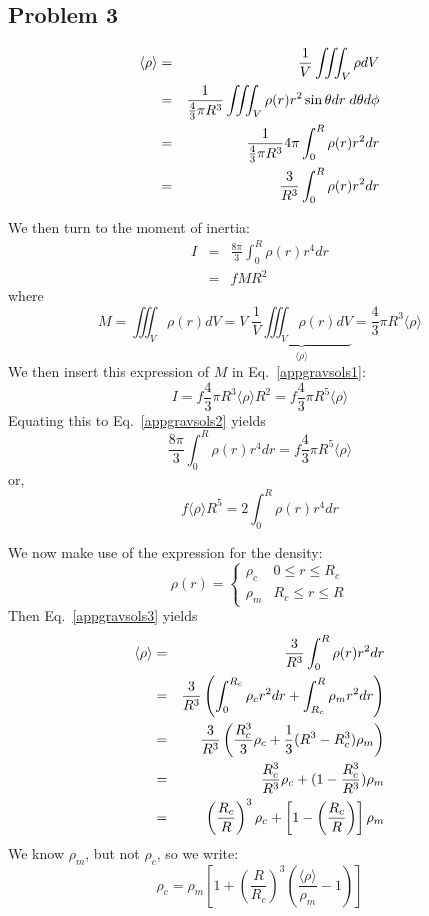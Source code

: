 \newpage
\subsection{Problem 3}


\begin{eqnarray}
\langle \rho \rangle 
&=& \frac{1}{V} \iiint_V \rho dV \nonumber\\
&=& \frac{1}{\frac{4}{3}\pi R^3} \iiint_V \rho(r) r^2 \sin\theta dr \; d\theta d\phi \nonumber\\
&=& \frac{1}{\frac{4}{3}\pi R^3}  4\pi \int_0^R \rho(r) r^2  dr \nonumber\\
&=& \frac{3}{R^3}   \int_0^R \rho(r) r^2  dr  \label{appgravsols3}
\end{eqnarray}

We then turn to the moment of inertia:
\begin{eqnarray}
I 
&=& \frac{8\pi}{3} \int_0^R \rho(r) r^4 dr \label{appgravsols2}\\
&=& f M R^2 \label{appgravsols1}
\end{eqnarray}
where 
\[
M 
= \iiint_V \rho(r) dV 
= V \; \underbrace{\frac{1}{V} \iiint_V \rho(r) dV }_{\langle\rho\rangle}
= \frac{4}{3}\pi R^3 \langle\rho\rangle
\]
We then insert this expression of $M$ in Eq.~\eqref{appgravsols1}:
\[
I
= f \frac{4}{3}\pi R^3 \langle\rho\rangle R^2
= f \frac{4}{3}\pi R^5 \langle\rho\rangle 
\]
Equating this to Eq.~\ref{appgravsols2} yields
\[
\frac{8\pi}{3} \int_0^R \rho(r) r^4 dr = f \frac{4}{3}\pi R^5 \langle\rho\rangle
\]
or, 
\begin{equation}
f \langle \rho \rangle R^5 = 2 \int_0^R \rho(r) r^4 dr  \label{appgravsols4}
\end{equation}


We now make use of the expression for the density:
\[
\rho(r) =
\left\{
\begin{array}{ll}
\rho_c & 0\leq r \leq R_c \\
\rho_m & R_c\leq r \leq R 
\end{array}
\right.
\]
Then Eq.~\eqref{appgravsols3} yields
\begin{eqnarray}
\langle \rho \rangle 
&=& \frac{3}{R^3}   \int_0^R \rho(r) r^2  dr \nonumber\\
&=& \frac{3}{R^3} \left(   \int_0^{R_c} \rho_c r^2  dr +  \int_{R_c}^R \rho_m r^2  dr \right) \nonumber\\
&=& \frac{3}{R^3} \left(  \frac{R_c^3}{3} \rho_c  +   \frac{1}{3}(R^3-R_c^3) \rho_m \right) \nonumber\\
&=&   \frac{R_c^3}{R^3} \rho_c  +   (1-\frac{R_c^3}{R^3}) \rho_m  \nonumber\\
&=&   \left(\frac{R_c}{R}\right)^3 \rho_c  +   \left[1-\left(\frac{R_c}{R}\right)\right] \rho_m 
\end{eqnarray}
We know $\rho_m$, but not $\rho_c$, so we write:
\begin{equation}
\rho_c 
=\rho_m \left[ 1 + \left(\frac{R}{R_c}\right)^3 \left(\frac{\langle \rho \rangle}{\rho_m} -1\right) \right]
\label{appgravsols5} 
\end{equation}

